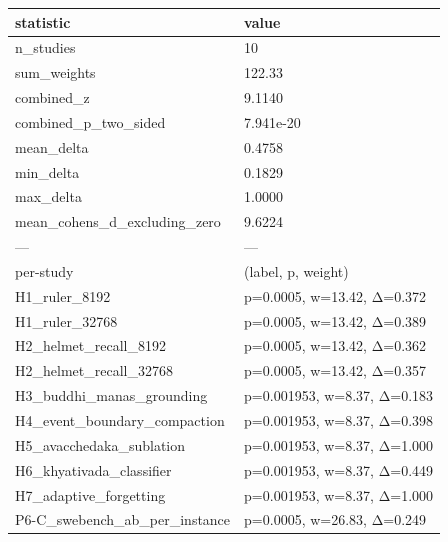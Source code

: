 {\def\LTcaptype{none} %
\begin{longtable}[]{@{}ll@{}}
\toprule\noalign{}
statistic & value \\
\midrule\noalign{}
\endhead
\bottomrule\noalign{}
\endlastfoot
n\_studies & 10 \\
sum\_weights & 122.33 \\
combined\_z & 9.1140 \\
combined\_p\_two\_sided & 7.941e-20 \\
mean\_delta & 0.4758 \\
min\_delta & 0.1829 \\
max\_delta & 1.0000 \\
mean\_cohens\_d\_excluding\_zero & 9.6224 \\
--- & --- \\
per-study & (label, p, weight) \\
H1\_ruler\_8192 & p=0.0005, w=13.42, Δ=0.372 \\
H1\_ruler\_32768 & p=0.0005, w=13.42, Δ=0.389 \\
H2\_helmet\_recall\_8192 & p=0.0005, w=13.42, Δ=0.362 \\
H2\_helmet\_recall\_32768 & p=0.0005, w=13.42, Δ=0.357 \\
H3\_buddhi\_manas\_grounding & p=0.001953, w=8.37, Δ=0.183 \\
H4\_event\_boundary\_compaction & p=0.001953, w=8.37, Δ=0.398 \\
H5\_avacchedaka\_sublation & p=0.001953, w=8.37, Δ=1.000 \\
H6\_khyativada\_classifier & p=0.001953, w=8.37, Δ=0.449 \\
H7\_adaptive\_forgetting & p=0.001953, w=8.37, Δ=1.000 \\
P6-C\_swebench\_ab\_per\_instance & p=0.0005, w=26.83, Δ=0.249 \\
\end{longtable}
}
